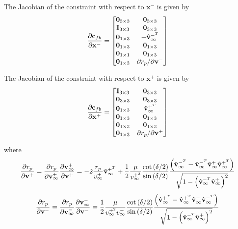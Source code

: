 The Jacobian of the constraint with respect to $\mathbf{x}^-$ is given by
\begin{equation}
\frac{\partial \mathbf{c}_{fb}}{\partial \mathbf{x}^-} =
\begin{bmatrix}
   \mathbf{0}_{3 \times 3} & \mathbf{0}_{3 \times 3}  \\
   \mathbf{I}_{3 \times 3} & \mathbf{0}_{3 \times 3} \\
   \mathbf{0}_{1 \times 3} & -\hat{\mathbf{v}}_{\infty}^{-^T}  \\
   \mathbf{0}_{1 \times 3} &  \mathbf{0}_{1 \times 3}  \\
   \mathbf{0}_{1 \times 1} &  \mathbf{0}_{1 \times 3}  \\
   \mathbf{0}_{1 \times 3} & \partial r_p/ \partial \mathbf{v}^-  \\
\end{bmatrix}
\end{equation}

The Jacobian of the constraint with respect to $\mathbf{x}^+$ is given by
\begin{equation}
\frac{\partial \mathbf{c}_{fb}}{\partial \mathbf{x}^+} =
\begin{bmatrix}
   \mathbf{I}_{3 \times 3}    & \mathbf{0}_{3 \times 3}   \\
   \mathbf{0}_{3 \times 3} & \mathbf{0}_{3 \times 3}  \\
    \mathbf{0}_{1 \times 3} & \hat{\mathbf{v}}_{\infty}^{+^T}   \\
   \mathbf{0}_{1 \times 3} &  \mathbf{0}_{1 \times 3}  \\
   \mathbf{0}_{1 \times 3} &  \mathbf{0}_{1 \times 3}  \\
   \mathbf{0}_{1 \times 3} & \partial r_p/ \partial \mathbf{v}^+  \\
\end{bmatrix}
\end{equation}

%
where
%
\begin{equation}
    \frac{\partial r_p}{\partial \mathbf{v}^+} = \frac{\partial r_p}{\partial \mathbf{v}_{\infty}^+}\frac{\partial \mathbf{v}_{\infty}^+}{\partial \mathbf{v}^+} =
    -2 \frac{r_p}{v_{\infty}^+}\hat{\mathbf{v}}_{\infty}^{+^T} + \frac{1}{2}\frac{\mu}{v_{\infty}^{+^3}}             \frac{\cot{(\delta/2})}{\sin{(\delta/2)}}
     \frac{ \left( \hat{\mathbf{v}}_{\infty}^{-^T} - \hat{\mathbf{v}}_{\infty}^{-^T} \hat{\mathbf{v}}_{\infty}^{+} \hat{\mathbf{v}}_{\infty}^{+^T} \right)}{\sqrt{1 - \left(\hat{\mathbf{v}}_{\infty}^{-^T} \hat{\mathbf{v}}_{\infty}^{+}\right)^2}}
\end{equation}
%
\begin{equation}
    \frac{\partial r_p}{\partial \mathbf{v}^-} = \frac{\partial r_p}{\partial \mathbf{v}_{\infty}^-}\frac{\partial \mathbf{v}_{\infty}^-}{\partial \mathbf{v}^-} = \frac{1}{2}\frac{\mu}{v_{\infty}^{+^2} v_{\infty}^{-}} \frac{\cot{(\delta/2})}{\sin{(\delta/2)}}
     \frac{ \left( \hat{\mathbf{v}}_{\infty}^{+^T} - \hat{\mathbf{v}}_{\infty}^{+^T} \hat{\mathbf{v}}_{\infty}^{-} \hat{\mathbf{v}}_{\infty}^{-^T} \right)}{\sqrt{1 - \left(\hat{\mathbf{v}}_{\infty}^{-^T} \hat{\mathbf{v}}_{\infty}^{+} \right)^2}}
\end{equation}
%

